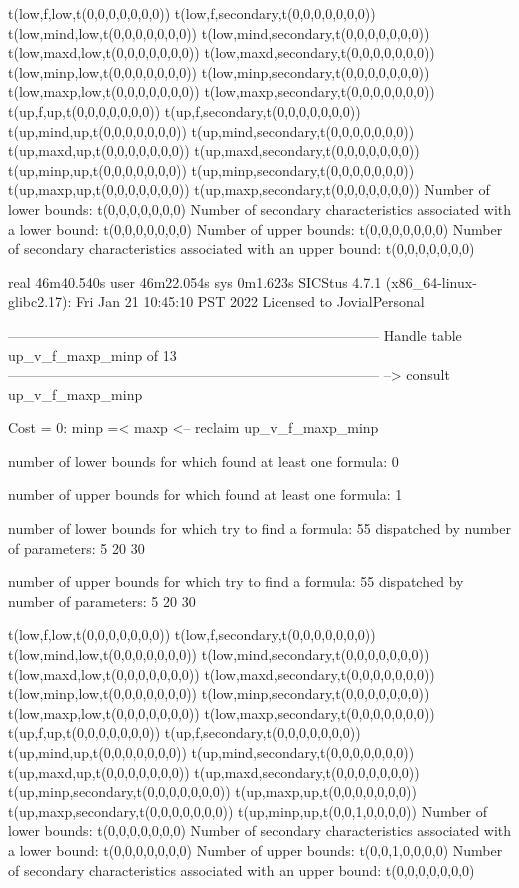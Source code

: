 t(low,f,low,t(0,0,0,0,0,0,0))
t(low,f,secondary,t(0,0,0,0,0,0,0))
t(low,mind,low,t(0,0,0,0,0,0,0))
t(low,mind,secondary,t(0,0,0,0,0,0,0))
t(low,maxd,low,t(0,0,0,0,0,0,0))
t(low,maxd,secondary,t(0,0,0,0,0,0,0))
t(low,minp,low,t(0,0,0,0,0,0,0))
t(low,minp,secondary,t(0,0,0,0,0,0,0))
t(low,maxp,low,t(0,0,0,0,0,0,0))
t(low,maxp,secondary,t(0,0,0,0,0,0,0))
t(up,f,up,t(0,0,0,0,0,0,0))
t(up,f,secondary,t(0,0,0,0,0,0,0))
t(up,mind,up,t(0,0,0,0,0,0,0))
t(up,mind,secondary,t(0,0,0,0,0,0,0))
t(up,maxd,up,t(0,0,0,0,0,0,0))
t(up,maxd,secondary,t(0,0,0,0,0,0,0))
t(up,minp,up,t(0,0,0,0,0,0,0))
t(up,minp,secondary,t(0,0,0,0,0,0,0))
t(up,maxp,up,t(0,0,0,0,0,0,0))
t(up,maxp,secondary,t(0,0,0,0,0,0,0))
Number of lower bounds:                                             t(0,0,0,0,0,0,0)
Number of secondary characteristics associated with a lower bound:  t(0,0,0,0,0,0,0)
Number of upper bounds:                                             t(0,0,0,0,0,0,0)
Number of secondary characteristics associated with an upper bound: t(0,0,0,0,0,0,0)

real	46m40.540s
user	46m22.054s
sys	0m1.623s
SICStus 4.7.1 (x86_64-linux-glibc2.17): Fri Jan 21 10:45:10 PST 2022
Licensed to JovialPersonal


--------------------------------------------------------------------------------
Handle table up_v_f_maxp_minp of 13
--------------------------------------------------------------------------------
--> consult up_v_f_maxp_minp

Cost =  0:  minp =< maxp
<-- reclaim up_v_f_maxp_minp

number of lower bounds for which found at least one formula: 0

number of upper bounds for which found at least one formula: 1

number of lower bounds for which try to find a formula: 55
dispatched by number of parameters: 5  20  30

number of upper bounds for which try to find a formula: 55
dispatched by number of parameters: 5  20  30

t(low,f,low,t(0,0,0,0,0,0,0))
t(low,f,secondary,t(0,0,0,0,0,0,0))
t(low,mind,low,t(0,0,0,0,0,0,0))
t(low,mind,secondary,t(0,0,0,0,0,0,0))
t(low,maxd,low,t(0,0,0,0,0,0,0))
t(low,maxd,secondary,t(0,0,0,0,0,0,0))
t(low,minp,low,t(0,0,0,0,0,0,0))
t(low,minp,secondary,t(0,0,0,0,0,0,0))
t(low,maxp,low,t(0,0,0,0,0,0,0))
t(low,maxp,secondary,t(0,0,0,0,0,0,0))
t(up,f,up,t(0,0,0,0,0,0,0))
t(up,f,secondary,t(0,0,0,0,0,0,0))
t(up,mind,up,t(0,0,0,0,0,0,0))
t(up,mind,secondary,t(0,0,0,0,0,0,0))
t(up,maxd,up,t(0,0,0,0,0,0,0))
t(up,maxd,secondary,t(0,0,0,0,0,0,0))
t(up,minp,secondary,t(0,0,0,0,0,0,0))
t(up,maxp,up,t(0,0,0,0,0,0,0))
t(up,maxp,secondary,t(0,0,0,0,0,0,0))
t(up,minp,up,t(0,0,1,0,0,0,0))
Number of lower bounds:                                             t(0,0,0,0,0,0,0)
Number of secondary characteristics associated with a lower bound:  t(0,0,0,0,0,0,0)
Number of upper bounds:                                             t(0,0,1,0,0,0,0)
Number of secondary characteristics associated with an upper bound: t(0,0,0,0,0,0,0)

